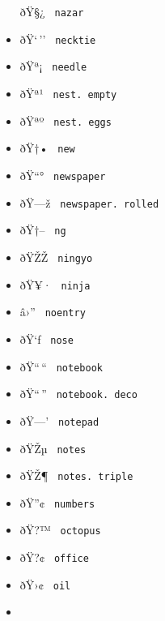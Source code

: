 \begin{itemize}
  \label{symbol-nazar}{{ ðŸ§¿ } \texttt{\ nazar\ }}
\item
  \label{symbol-necktie}{{ ðŸ`\,'' }
  \texttt{\ necktie\ }}
\item
  \label{symbol-needle}{{ ðŸª¡ } \texttt{\ needle\ }}
\item
  \label{symbol-nest.empty}{{ ðŸª¹ }
  \texttt{\ nest.\ empty\ }}
\item
  \label{symbol-nest.eggs}{{ ðŸªº }
  \texttt{\ nest.\ eggs\ }}
\item
  \label{symbol-new}{{ ðŸ†• } \texttt{\ new\ }}
\item
  \label{symbol-newspaper}{{ ðŸ``° }
  \texttt{\ newspaper\ }}
\item
  \label{symbol-newspaper.rolled}{{ ðŸ---ž }
  \texttt{\ newspaper.\ rolled\ }}
\item
  \label{symbol-ng}{{ ðŸ†-- } \texttt{\ ng\ }}
\item
  \label{symbol-ningyo}{{ ðŸŽŽ } \texttt{\ ningyo\ }}
\item
  \label{symbol-ninja}{{ ðŸ¥· } \texttt{\ ninja\ }}
\item
  \label{symbol-noentry}{{ â›'' } \texttt{\ noentry\ }}
\item
  \label{symbol-nose}{{ ðŸ`ƒ } \texttt{\ nose\ }}
\item
  \label{symbol-notebook}{{ ðŸ``\,`` }
  \texttt{\ notebook\ }}
\item
  \label{symbol-notebook.deco}{{ ðŸ``\,'' }
  \texttt{\ notebook.\ deco\ }}
\item
  \label{symbol-notepad}{{ ðŸ---' } \texttt{\ notepad\ }}
\item
  \label{symbol-notes}{{ ðŸŽµ } \texttt{\ notes\ }}
\item
  \label{symbol-notes.triple}{{ ðŸŽ¶ }
  \texttt{\ notes.\ triple\ }}
\item
  \label{symbol-numbers}{{ ðŸ''¢ } \texttt{\ numbers\ }}
\item
  \label{symbol-octopus}{{ ðŸ?™ } \texttt{\ octopus\ }}
\item
  \label{symbol-office}{{ ðŸ?¢ } \texttt{\ office\ }}
\item
  \label{symbol-oil}{{ ðŸ›¢ } \texttt{\ oil\ }}
\item

\end{itemize}
